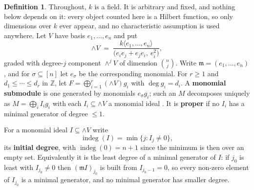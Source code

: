 \documentclass[11pt, a4paper, abstract=yes]{scrartcl}
\theoremstyle{definition}
\newtheorem{definition}{Definition}
\theoremstyle{remark}
\theoremstyle{plain}
\newcommand{\indeg}{\operatorname{indeg}}
\newcommand{\Ext}{\mathord{\wedge }V}
\let\autocite\cite
\begin{document}
\begin{definition}
Throughout, \(k\) is a field. It is arbitrary and fixed, and nothing below depends on it: every
object counted here is a Hilbert function, so only dimensions over \(k\) ever appear, and no
characteristic assumption is used anywhere. Let \(V\) have basis \(e_1,\dots,e_n\) and put
\begin{equation}\label{eq:def-ext}
  \Ext\;=\;\frac{k\langle e_1,\dots,e_n\rangle}{\bigl(e_ie_j+e_je_i,\ e_i^2\bigr)},
\end{equation}
graded with degree-\(j\) component \(\wedge^jV\) of dimension \(\binom nj\). Write
\(\mathfrak m=(e_1,\dots,e_n)\), and for \(\sigma\subseteq[n]\) let \(e_\sigma\) be the corresponding
monomial. For \(r\ge1\) and \(d_1\le\cdots\le d_r\) in \(\mathbb Z\), let
\(F=\bigoplus_{i=1}^r(\Ext)g_i\) with \(\deg g_i=d_i\). A \textbf{monomial submodule} is one generated by
monomials \(e_\sigma g_i\); such an \(M\) decomposes uniquely as \(M=\bigoplus_iI_ig_i\) with each
\(I_i\subseteq \Ext\) a monomial ideal \autocite[Definition 2.1]{AmataCrupi2020}. It is \textbf{proper} if no \(I_i\) has
a minimal generator of degree \(\le1\).

For a monomial ideal \(I\subseteq \Ext\) write
\begin{equation}\label{eq:indeg-ideal}
  \indeg(I)=\min\lbrace j:I_j\ne0\rbrace ,
\end{equation}
its \textbf{initial degree}, with \(\indeg(0)=n+1\) since the minimum is then over an empty set.
Equivalently it is the least degree of a minimal generator of \(I\): if \(j_0\) is least with
\(I_{j_0}\ne0\) then \((\mathfrak mI)_{j_0}\) is built from \(I_{j_0-1}=0\), so every non-zero
element of \(I_{j_0}\) is a minimal generator, and no minimal generator has smaller degree.
\label{def-setup}
\end{definition}
\end{document}
